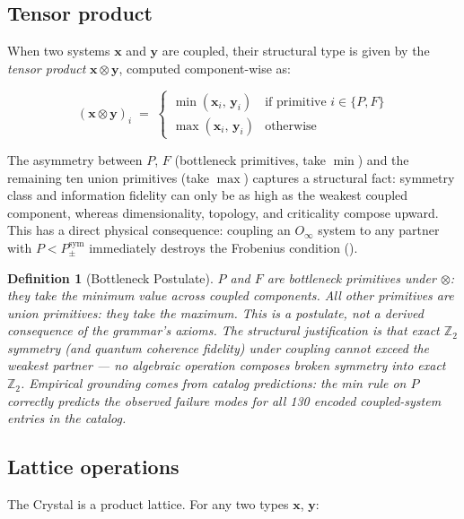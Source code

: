 \documentclass[12pt,a4paper]{article}
\newtheorem{definition}{Definition}
\newcommand{\xvec}{\mathbf{x}}
\newcommand{\yvec}{\mathbf{y}}
\newcommand{\Ppms}{P_{\pm}^{\text{sym}}}
\newcommand{\Oinf}{O_\infty}
\newcommand{\tensor}{\otimes}
\begin{document}
\subsection{Tensor product}

When two systems $\xvec$ and $\yvec$ are coupled, their structural
type is given by the \emph{tensor product} $\xvec \tensor \yvec$,
computed component-wise as:

\begin{equation}
  (\xvec \tensor \yvec)_i \;=\;
  \begin{cases}
    \min(\xvec_i,\, \yvec_i) & \text{if primitive } i \in \{P, F\}\\
    \max(\xvec_i,\, \yvec_i) & \text{otherwise}
  \end{cases}
  \label{eq:tensor}
\end{equation}

The asymmetry between $P$, $F$ (bottleneck primitives, take $\min$)
and the remaining ten union primitives (take $\max$) captures a
structural fact: symmetry class and information fidelity can only be
as high as the weakest coupled component, whereas dimensionality,
topology, and criticality compose upward. This has a direct physical
consequence: coupling an $\Oinf$ system to any partner with
$P < \Ppms$ immediately destroys the Frobenius condition
().

\begin{definition}[Bottleneck Postulate]
\label{def:bottleneck}
$P$ and $F$ are \emph{bottleneck primitives} under $\otimes$: they
take the minimum value across coupled components. All other primitives
are \emph{union primitives}: they take the maximum. This is a postulate,
not a derived consequence of the grammar's axioms. The structural
justification is that exact $\mathbb{Z}_2$ symmetry (and quantum
coherence fidelity) under coupling cannot exceed the weakest partner
--- no algebraic operation composes broken symmetry into exact
$\mathbb{Z}_2$. Empirical grounding comes from catalog predictions: the
min rule on $P$ correctly predicts the observed failure modes for all
130 encoded coupled-system entries in the catalog.
\end{definition}

\subsection{Lattice operations}

The Crystal is a product lattice. For any two types $\xvec$, $\yvec$:
\end{document}
